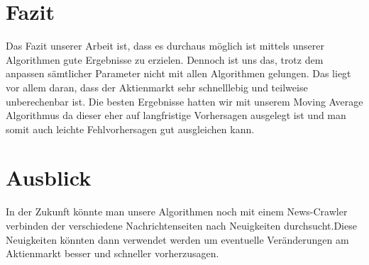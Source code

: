 \documentclass[12pt]{article} %
\begin{document}








\section{Fazit} %

Das Fazit unserer Arbeit ist, dass es durchaus möglich ist mittels unserer Algorithmen
gute Ergebnisse zu erzielen. Dennoch ist uns das, trotz dem anpassen sämtlicher Parameter nicht mit allen Algorithmen gelungen. Das liegt vor allem daran, dass der Aktienmarkt sehr schnelllebig und teilweise unberechenbar ist. Die besten Ergebnisse hatten wir mit unserem Moving Average Algorithmus da dieser eher auf langfristige Vorhersagen ausgelegt ist und man somit auch leichte Fehlvorhersagen gut ausgleichen kann.

\section{Ausblick}

In der Zukunft könnte man unsere Algorithmen noch mit einem News-Crawler verbinden der verschiedene Nachrichtenseiten nach Neuigkeiten durchsucht.Diese Neuigkeiten könnten dann verwendet werden um eventuelle Veränderungen am Aktienmarkt besser und schneller vorherzusagen.




\end{document}
